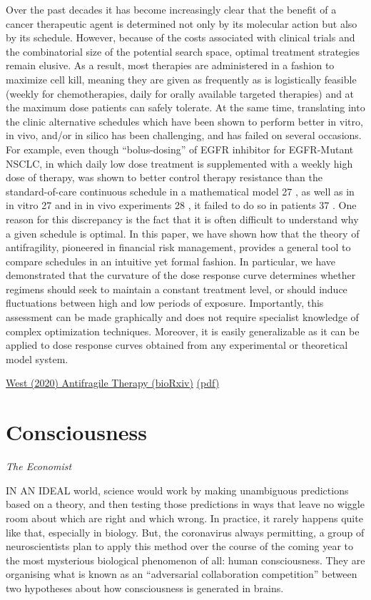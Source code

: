 \documentclass[
]{book}
\begin{document}
Over the past decades it has become increasingly clear that the benefit of a cancer therapeutic
agent is determined not only by its molecular action but also by its schedule. However,
because of the costs associated with clinical trials and the combinatorial size of the potential
search space, optimal treatment strategies remain elusive. As a result, most therapies are
administered in a fashion to maximize cell kill, meaning they are given as frequently as is
logistically feasible (weekly for chemotherapies, daily for orally available targeted therapies)
and at the maximum dose patients can safely tolerate. At the same time, translating into
the clinic alternative schedules which have been shown to perform better in vitro, in vivo,
and/or in silico has been challenging, and has failed on several occasions. For example, even
though ``bolus-dosing'' of EGFR inhibitor for EGFR-Mutant NSCLC, in which daily low
dose treatment is supplemented with a weekly high dose of therapy, was shown to better
control therapy resistance than the standard-of-care continuous schedule in a mathematical
model 27 , as well as in in vitro 27 and in in vivo experiments 28 , it failed to do so in patients 37 .
One reason for this discrepancy is the fact that it is often difficult to understand why a
given schedule is optimal. In this paper, we have shown how that the theory of antifragility,
pioneered in financial risk management, provides a general tool to compare schedules in an
intuitive yet formal fashion. In particular, we have demonstrated that the curvature of the dose
response curve determines whether regimens should seek to maintain a constant treatment
level, or should induce fluctuations between high and low periods of exposure. Importantly,
this assessment can be made graphically and does not require specialist knowledge of
complex optimization techniques. Moreover, it is easily generalizable as it can be applied to
dose response curves obtained from any experimental or theoretical model system.

\href{https://doi.org/10.1101/2020.10.08.331678}{West (2020) Antifragile Therapy (bioRxiv)}
\href{pdf/West_2020_Antifragile_Therapy.pdf}{(pdf)}

\hypertarget{consciousness}{%
\chapter{Consciousness}\label{consciousness}}

\emph{The Economist}

IN AN IDEAL world, science would work by making unambiguous predictions based on a theory, and then testing those predictions in ways that leave no wiggle room about which are right and which wrong. In practice, it rarely happens quite like that, especially in biology. But, the coronavirus always permitting, a group of neuroscientists plan to apply this method over the course of the coming year to the most mysterious biological phenomenon of all: human consciousness. They are organising what is known as an ``adversarial collab­oration competition'' between two hypotheses about how consciousness is generated in brains.
\end{document}
